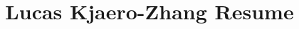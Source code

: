 \documentclass[margin]{res}
\title{Lucas Kjaero-Zhang Resume}
\begin{document}


\address{+45 42 59 80 50\\Copenhagen, Denmark}
\address{\href{mailto:lucas@lucaskjaerozhang.com}{Lucas@LucasKjaeroZhang.com}\\\href{https://www.lucaskjaerozhang.com}{www.LucasKjaeroZhang.com}}


\end{document}
